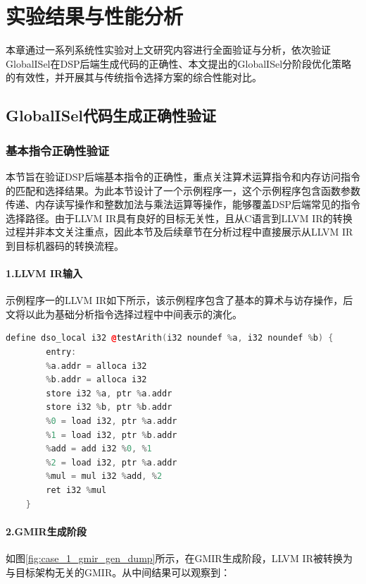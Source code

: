 \chapter{实验结果与性能分析}
本章通过一系列系统性实验对上文研究内容进行全面验证与分析，依次验证GlobalISel在DSP后端生成代码的正确性、本文提出的GlobalISel分阶段优化策略的有效性，并开展其与传统指令选择方案的综合性能对比。


\section{GlobalISel代码生成正确性验证}


\subsection{基本指令正确性验证}
本节旨在验证DSP后端基本指令的正确性，重点关注算术运算指令和内存访问指令的匹配和选择结果。为此本节设计了一个示例程序一，这个示例程序包含函数参数传递、内存读写操作和整数加法与乘法运算等操作，能够覆盖DSP后端常见的指令选择路径。由于LLVM IR具有良好的目标无关性，且从C语言到LLVM IR的转换过程并非本文关注重点，因此本节及后续章节在分析过程中直接展示从LLVM IR到目标机器码的转换流程。


\subsubsection{1.LLVM IR输入}
示例程序一的LLVM IR如下所示，该示例程序包含了基本的算术与访存操作，后文将以此为基础分析指令选择过程中中间表示的演化。

\lstset{language=c++}
\begin{lstlisting}[language=C++]
	define dso_local i32 @testArith(i32 noundef %a, i32 noundef %b) {
		entry:
		%a.addr = alloca i32
		%b.addr = alloca i32
		store i32 %a, ptr %a.addr
		store i32 %b, ptr %b.addr
		%0 = load i32, ptr %a.addr
		%1 = load i32, ptr %b.addr
		%add = add i32 %0, %1
		%2 = load i32, ptr %a.addr
		%mul = mul i32 %add, %2
		ret i32 %mul
	}
\end{lstlisting}


\subsubsection{2.GMIR生成阶段}
如图\ref{fig:case_1_gmir_gen_dump}所示，在GMIR生成阶段，LLVM IR被转换为与目标架构无关的GMIR。从中间结果可以观察到：

